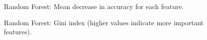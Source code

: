 \documentclass[letterpaper, 10 pt, conference]{ieeeconf}  %
\begin{document}
\begin{figure}[t]
  \caption{Random Forest: Mean decrease in accuracy for each feature.}
\label{fig:feature_importance_1}
\vspace{-0.2in}
\end{figure}
\begin{figure}[t]
  \caption{Random Forest: Gini index (higher values indicate more important features).}
\label{fig:feature_importance_2}
\vspace{-0.3in} 
\end{figure}
\end{document}

